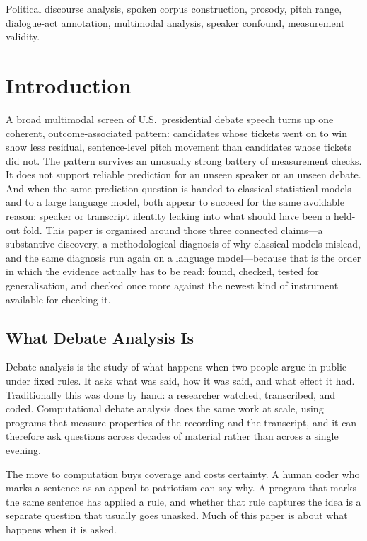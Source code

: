 \documentclass[journal]{IEEEtran}
\begin{document}
\begin{IEEEkeywords}
Political discourse analysis, spoken corpus construction, prosody, pitch
range, dialogue-act annotation, multimodal analysis, speaker confound,
measurement validity.
\end{IEEEkeywords}

\section{Introduction}
\label{sec:intro}

A broad multimodal screen of U.S.\ presidential debate speech turns up one
coherent, outcome-associated pattern: candidates whose tickets went on to win
show less residual, sentence-level pitch movement than candidates whose
tickets did not. The pattern survives an unusually strong battery of
measurement checks. It does not support reliable prediction for an unseen
speaker or an unseen debate. And when the same prediction question is handed
to classical statistical models and to a large language model, both appear to
succeed for the same avoidable reason: speaker or transcript identity leaking
into what should have been a held-out fold. This paper is organised around
those three connected claims---a substantive discovery, a methodological
diagnosis of why classical models mislead, and the same diagnosis run again
on a language model---because that is the order in which the evidence
actually has to be read: found, checked, tested for generalisation, and
checked once more against the newest kind of instrument available for
checking it.

\subsection{What Debate Analysis Is}
\label{sec:intro:what}

Debate analysis is the study of what happens when two people argue in public
under fixed rules. It asks what was said, how it was said, and what effect it
had. Traditionally this was done by hand: a researcher watched, transcribed,
and coded. Computational debate analysis does the same work at scale, using
programs that measure properties of the recording and the transcript, and it
can therefore ask questions across decades of material rather than across a
single evening.

The move to computation buys coverage and costs certainty. A human coder who
marks a sentence as an appeal to patriotism can say why. A program that marks
the same sentence has applied a rule, and whether that rule captures the idea
is a separate question that usually goes unasked. Much of this paper is about
what happens when it is asked.
\end{document}
